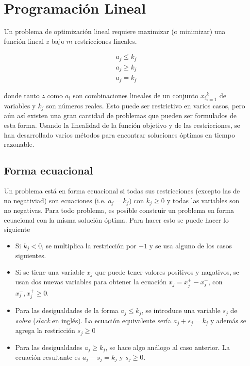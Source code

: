 \chapter{Programación Lineal}
\label{app:linprog}

Un problema de optimización lineal requiere maximizar (o minimizar) una función
lineal $z$ bajo $m$ restricciones lineales.

\begin{align}
  a_{j} \le k_{j}\\
  a_{j} \ge k_{j}\\
  a_{j} = k_{j}
\end{align}

donde tanto $z$ como $a_{i}$ son combinaciones lineales de un conjunto
${x_{i}}_{i=1}^{k}$ de variables y $k_{j}$ son números reales. Esto puede ser
restrictivo en varios casos, pero aún así existen una gran cantidad de problemas
que pueden ser formulados de esta forma. Usando la linealidad de la función
objetivo y de las restricciones, se han desarrollado varios métodos para
encontrar soluciones óptimas en tiempo razonable.

\section{Forma ecuacional}

Un problema está en forma ecuacional si todas sus restricciones (excepto las de
no negativiad) son ecuaciones (i.e. $a_{j} = k_{j}$) con $k_{j} \ge 0$ y todas
las variables son no negativas. Para todo problema, es posible construir un
problema en forma ecuacional con la misma solución óptima. Para hacer esto se
puede hacer lo siguiente

\begin{itemize}
  \item Si $k_{j} < 0$, se multiplica la restricción por $-1$ y se usa alguno de
        los casos siguientes.
  \item Si se tiene una variable $x_{j}$ que puede tener valores positivos y
        nagativos, se usan dos nuevas variables para obtener la ecuación
        $x_{j} = x_{j}^{+} - x_{j}^{-}$, con $x_{j}^{-}, x_{j}^{+} \ge 0$.
  \item Para las desigualdades de la forma $a_{j} \le k_{j}$, se introduce una
        variable $s_{j}$ de \emph{sobra} (\emph{slack} en inglés). La ecuación
        equivalente sería $a_{j} + s_{j} = k_{j}$ y además se agrega la
        restricción $s_{j} \ge 0$

  \item Para las desigualdades $a_{j} \ge k_{j}$, se hace algo análogo al caso
        anterior. La ecuación resultante es $a_{j} - s_{j} = k_{j}$ y $s_{j}
        \ge 0$.
\end{itemize}
